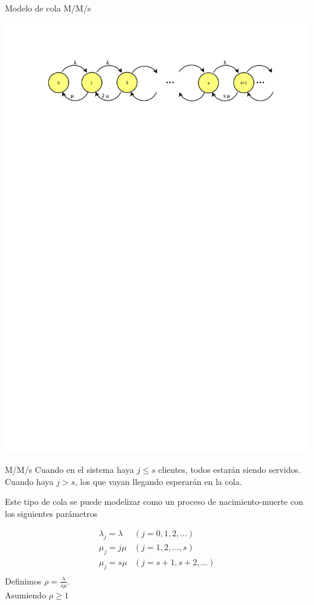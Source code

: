 \begin{frame}
	\centering \LARGE \color{naranjaUCA} Modelo de cola M/M/s
			\begin{center}
				\includegraphics[trim = 10mm 220mm 10mm 25mm, clip,width=0.9\linewidth]{MMs}
			\end{center}
\end{frame}
\begin{frame}{M/M/s}
	Cuando en el sistema haya $j\leq s$ clientes, todos estar\'an siendo servidos. Cuando haya $j>s$, los que vayan llegando esperar\'an en la cola. \\
	\pause
	
	Este tipo de cola se puede modelizar como un proceso de nacimiento-muerte con los siguientes par\'ametros
	
	\pause
		$$\begin{array}{cc}
		\lambda_j=\lambda & (j=0,1,2,...)\\
		\mu_j=j\mu & (j=1,2,...,s)\\
		\mu_j=s\mu & (j=s+1,s+2,...)\\
		\end{array}$$
	\pause
	Definimos $\rho=\displaystyle\frac{\lambda}{s\mu}$.
	\\ 
	\pause
	Asumiendo $\rho\geq1$ 
\end{frame}

